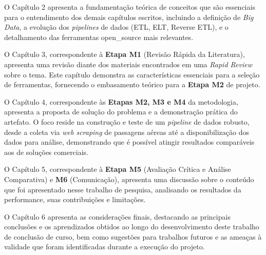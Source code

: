 O Capítulo 2 apresenta a fundamentação teórica de conceitos que são essenciais para o entendimento dos demais capítulos escritos, incluindo a definição de \textit{Big Data}, a evolução dos \textit{pipelines} de dados (ETL, ELT, Reverse ETL), e o detalhamento das ferramentas \acs{open_source} mais relevantes.

O Capítulo 3, correspondente à \textbf{Etapa M1} (Revisão Rápida da Literatura), apresenta uma revisão diante dos materiais encontrados em uma \textit{Rapid Review} \cite[]{dobbins2017rapid} sobre o tema. Este capítulo demonstra as características essenciais para a seleção de ferramentas, fornecendo o embasamento teórico para a \textbf{Etapa M2} de projeto.

O Capítulo 4, correspondente às \textbf{Etapas M2, M3 e M4} da metodologia, apresenta a proposta de solução do problema e a demonstração prática do artefato. O foco reside na construção e teste de um \textit{pipeline} de dados robusto, desde a coleta via \textit{web scraping} de passagens aéreas até a disponibilização dos dados para análise, demonstrando que é possível atingir resultados comparáveis aos de soluções comerciais.

O Capítulo 5, correspondente à \textbf{Etapa M5} (Avaliação Crítica e Análise Comparativa) e \textbf{M6} (Comunicação), apresenta uma discussão sobre o conteúdo que foi apresentado nesse trabalho de pesquisa, analisando os resultados da performance, suas contribuições e limitações.

O Capítulo 6 apresenta as considerações finais, destacando as principais conclusões e os aprendizados obtidos ao longo do desenvolvimento deste trabalho de conclusão de curso, bem como sugestões para trabalhos futuros e as ameaças à validade que foram identificadas durante a execução do projeto.